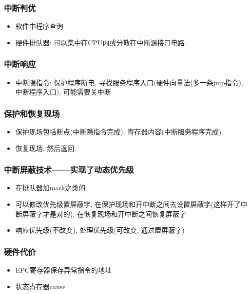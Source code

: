 \documentclass[UTF8]{article}
\begin{document}
\subsubsection{中断判优}
\begin{itemize}
\item 软件中程序查询
\item 硬件排队器: 可以集中在CPU内或分散在中断源接口电路.
\end{itemize}
\subsubsection{中断响应}
\begin{itemize}
\item 中断隐指令: 保护程序断电, 寻找服务程序入口(硬件向量法(多一条jmp指令), 中断程序入口), 可能需要关中断
\end{itemize}
\subsubsection{保护和恢复现场}
\begin{itemize}
\item 保护现场包括断点(中断隐指令完成), 寄存器内容(中断服务程序完成)
\item 恢复现场, 然后返回.
\end{itemize}
\subsubsection{中断屏蔽技术——实现了动态优先级}
\begin{itemize}
\item 在排队器加mask之类的
\item 可以修改优先级置屏蔽字, 在保护现场和开中断之间去设置屏蔽字(这样开了中断屏蔽字才是对的), 在恢复现场和开中断之间恢复屏蔽字
\item 响应优先级(不改变), 处理优先级(可改变, 通过置屏蔽字)
\end{itemize}
\subsubsection{硬件代价}
\begin{itemize}
\item EPC寄存器保存异常指令的地址
\item 状态寄存器cause
\end{itemize}
\end{document}
